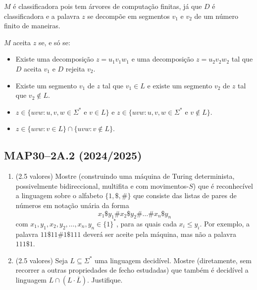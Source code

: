 \documentclass[a4paper,12pt]{article}
\begin{document}
\begin{enumerate}[label=\alph*)]
\begin{center}
  \end{center}

  $M$ é classificadora pois tem árvores de computação finitas, já que $D$ é classificadora e a palavra $z$ se decompõe em segmentos $v_1$ e $v_2$ de um número finito de maneiras.
  
  $M$ aceita $z$ se, e só se:
  \begin{itemize}
      \item Existe uma decomposição $z=u_1v_1w_1$ e uma decomposição $z=u_2v_2w_2$ tal que $D$ aceita $v_1$ e $D$ rejeita $v_2$.
      \item Existe um segmento $v_1$ de $z$ tal que $v_1 \in L$ e existe um segmento $v_2$ de $z$ tal que $v_2 \notin L$.
      \item $z \in \{uvw : u, v, w \in \Sigma^* \text{ e } v \in L\}$ e $z \in \{uvw : u, v, w \in \Sigma^* \text{ e } v \notin L\}$.
      \item $z \in \{uvw : v \in L\} \cap \{uvw : v \notin L\}$.
  \end{itemize}
\end{enumerate}

\vspace{1.0cm}
\subsection*{MAP30–2A.2 (2024/2025)}
\begin{enumerate}[label=\alph*)]
  \item (2.5 valores) Mostre (construindo uma máquina de Turing determinista, possivelmente bidireccional, multifita e com movimentos-\(S\)) que é reconhecível a linguagem sobre o alfabeto \(\{1, \$, \#\}\) que consiste das listas de pares de números em notação unária da forma  
  \[x_1 \$ y_1 \# x_2 \$ y_2 \# \ldots \# x_n \$ y_n\]  
  com \(x_1, y_1, x_2, y_2, \ldots, x_n, y_n \in \{1\}^*\), para as quais cada \(x_i \leq y_i\).  
  Por exemplo, a palavra \(11\$11\#1\$111\) deverá ser aceite pela máquina, mas não a palavra \(111\$1\).

  \item (2.5 valores) Seja \(L \subseteq \Sigma^*\) uma linguagem decidível. Mostre (diretamente, sem recorrer a outras propriedades de fecho estudadas) que também é decidível a linguagem \(L \cap (L \cdot \overline{L})\). Justifique.
\end{enumerate}
\end{document}

